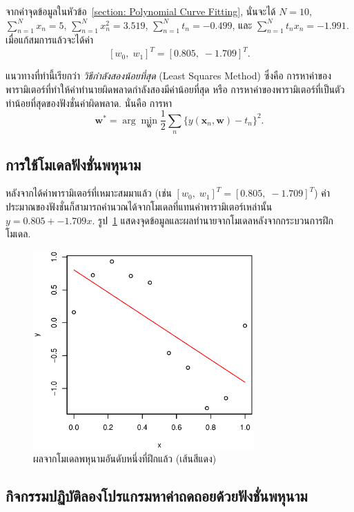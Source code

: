 จากค่าจุดข้อมูลในหัวข้อ~\ref{section: Polynomial Curve Fitting}, นั่นจะได้ $N = 10$, $\sum_{n=1}^N x_n = 5$, $\sum_{n=1}^N x_n^2 = 3.519$, $\sum_{n=1}^N t_n = -0.499$, และ $\sum_{n=1}^N t_n x_n = -1.991$.
เมื่อแก้สมการแล้วจะได้ค่า 
\[
[w_0, \; w_1]^T = [0.805, \; -1.709]^T.
\]

แนวทางที่ทำนี้เรียกว่า \textit{วิธีกำลังสองน้อยที่สุด} (Least Squares Method) ซึ่งคือ 
การหาค่าของพารามิเตอร์ที่ทำให้ค่าทำนายผิดพลาดกำลังสองมีค่าน้อยที่สุด
หรือ การหาค่าของพารามิเตอร์ที่เป็นตัวทำน้อยที่สุดของฟังชั่นค่าผิดพลาด.
นั่นคือ การหา 
\[
\mathbf{w}^\ast = \arg\min_{\mathbf{w}} \frac{1}{2} \sum_n \{y(\mathbf{x}_n, \mathbf{w}) - t_n\}^2.
\]

\subsection{การใช้โมเดลฟังชั่นพหุนาม}
หลังจากได้ค่าพารามิเตอร์ที่เหมาะสมมาแล้ว (เช่น $[w_0, \; w_1]^T = [0.805, \; -1.709]^T$) ค่าประมาณของฟังชั่นก็สามารถคำนวณได้จากโมเดลที่แทนค่าพารามิเตอร์เหล่านั้น $y = 0.805 + -1.709 x$.
รูป~\ref{fig: bg curve fitting M1} แสดงจุดข้อมูลและผลทำนายจากโมเดลหลังจากกระบวนการฝึกโมเดล.

%
\begin{figure}
\begin{center}
\includegraphics[height=3.0in]{02Background/bgCurveFittingM1.eps}
\end{center}
\caption{ผลจากโมเดลพหุนามอันดับหนึ่งที่ฝึกแล้ว (เส้นสีแดง)}
\label{fig: bg curve fitting M1}
\end{figure}
%

\subsection{กิจกรรมปฏิบัติลองโปรแกรมหาค่าถดถอยด้วยฟังชั่นพหุนาม}


